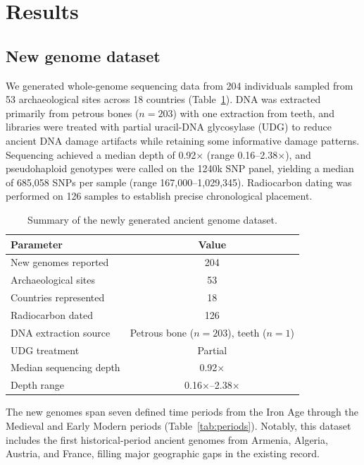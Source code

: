 \documentclass[11pt]{article}
\begin{document}
\section{Results}

\subsection{New genome dataset}

We generated whole-genome sequencing data from 204 individuals sampled from 53 archaeological sites across 18 countries (Table~\ref{tab:samples}). DNA was extracted primarily from petrous bones ($n = 203$) with one extraction from teeth, and libraries were treated with partial uracil-DNA glycosylase (UDG) to reduce ancient DNA damage artifacts while retaining some informative damage patterns. Sequencing achieved a median depth of 0.92$\times$ (range 0.16--2.38$\times$), and pseudohaploid genotypes were called on the 1240k SNP panel, yielding a median of 685,058 SNPs per sample (range 167,000--1,029,345). Radiocarbon dating was performed on 126 samples to establish precise chronological placement.

\begin{table}[ht]
\centering
\caption{Summary of the newly generated ancient genome dataset.}
\label{tab:samples}
\begin{tabular}{lc}
\toprule
Parameter & Value \\
\midrule
New genomes reported & 204 \\
Archaeological sites & 53 \\
Countries represented & 18 \\
Radiocarbon dated & 126 \\
DNA extraction source & Petrous bone ($n=203$), teeth ($n=1$) \\
UDG treatment & Partial \\
Median sequencing depth & 0.92$\times$ \\
Depth range & 0.16$\times$--2.38$\times$ \\
\bottomrule
\end{tabular}
\end{table}

The new genomes span seven defined time periods from the Iron Age through the Medieval and Early Modern periods (Table~\ref{tab:periods}). Notably, this dataset includes the first historical-period ancient genomes from Armenia, Algeria, Austria, and France, filling major geographic gaps in the existing record.
\end{document}
